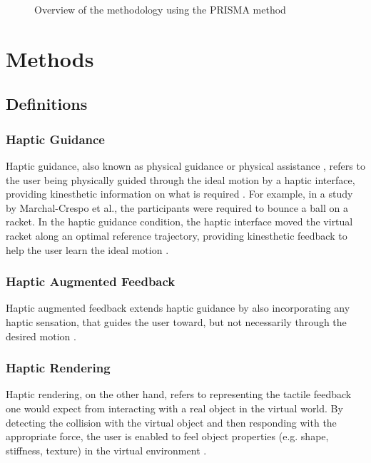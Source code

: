 
\begin{figure*}[htbp]
    \centering
     
    \caption{Overview of the methodology using the PRISMA method}
    \label{fig:prisma}
\end{figure*}

\section{Methods}
\label{sec:methods}

\subsection{Definitions}
\label{sec:definitions}

\subsubsection{Haptic Guidance}
Haptic guidance, also known as physical guidance or physical assistance \cite{Sigrist2013AugmentedReview}, refers to the user being physically guided through the ideal motion by a haptic interface, providing kinesthetic information on what is required \cite{Feygin2002HapticSkill}. 
For example, in a study by Marchal-Crespo et al., the participants were required to bounce a ball on a racket. In the haptic guidance condition, the haptic interface moved the virtual racket along an optimal reference trajectory, providing kinesthetic feedback to help the user learn the ideal motion \cite{Crespo2015}.

\subsubsection{Haptic Augmented Feedback}
Haptic augmented feedback extends haptic guidance by also incorporating any haptic sensation, that guides the user toward, but not necessarily through the desired motion \cite{Sigrist2013AugmentedReview}.

\subsubsection{Haptic Rendering}
Haptic rendering, on the other hand, refers to representing the tactile feedback one would expect from interacting with a real object in the virtual world. By detecting the collision with the virtual object and then responding with the appropriate force, the user is enabled to feel object properties (e.g. shape, stiffness, texture) in the virtual environment \cite{Basdogan2002HapticEnvironments, Salisbury1997Phantom-basedObjects}. 

